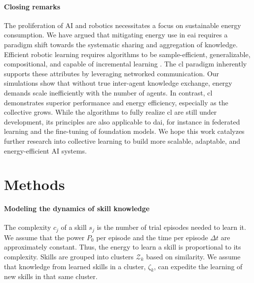 \documentclass[12pt]{article}
\begin{document}
\paragraph*{Closing remarks}
The proliferation of AI and robotics necessitates a focus on sustainable energy consumption. We have argued that mitigating energy use in \ac{eai} requires a paradigm shift towards the systematic sharing and aggregation of knowledge. Efficient robotic learning requires algorithms to be sample-efficient, generalizable, compositional, and capable of incremental learning \cite{Kaelbling2020foundationefficientrobot}. The \acl{cl} paradigm inherently supports these attributes by leveraging networked communication. Our simulations show that without true inter-agent knowledge exchange, energy demands scale inefficiently with the number of agents. In contrast, \ac{cl} demonstrates superior performance and energy efficiency, especially as the collective grows. While the algorithms to fully realize \ac{cl} are still under development, its principles are also applicable to \ac{dai}, for instance in federated learning and the fine-tuning of foundation models. We hope this work catalyzes further research into collective learning to build more scalable, adaptable, and energy-efficient AI systems.

\section*{Methods}\label{sec:methods_revised}
\paragraph*{Modeling the dynamics of skill knowledge}
The complexity $c_j$ of a skill $s_j$ is the number of trial episodes needed to learn it. We assume that the power $P_0$ per episode and the time per episode $\Delta t$ are approximately constant. Thus, the energy to learn a skill is proportional to its complexity. Skills are grouped into clusters $\mathcal{Z}_k$ based on similarity. We assume that knowledge from learned skills in a cluster, $\mathcal{\zeta}_k$, can expedite the learning of new skills in that same cluster.
\end{document}
